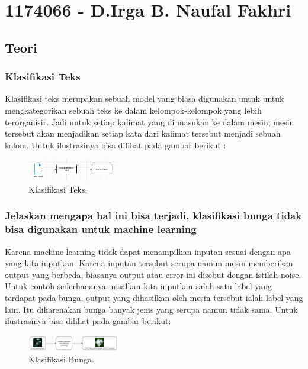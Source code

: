 \section{1174066 - D.Irga B. Naufal Fakhri}
\subsection{Teori}
\subsubsection{Klasifikasi Teks}
\hfill\break
Klasifikasi teks merupakan sebuah model yang biasa digunakan untuk untuk mengkategorikan sebuah teks ke dalam kelompok-kelompok yang lebih terorganisir. Jadi untuk setiap kalimat yang di masukan ke dalam mesin, mesin tersebut akan menjadikan setiap kata dari kalimat tersebut menjadi sebuah kolom. Untuk ilustrasinya bisa dilihat pada gambar berikut : 

\begin{figure}[H]
\centering
\includegraphics[width=4cm]{figures/1174066/4/1.jpg}
\caption{Klasifikasi Teks.}
\end{figure}

\subsubsection{Jelaskan mengapa hal ini bisa terjadi, klasifikasi bunga tidak bisa digunakan untuk machine learning}
\hfill\break
Karena machine learning tidak dapat menampilkan inputan sesuai dengan apa yang kita inputkan. Karena inputan tersebut serupa namun mesin memberikan output yang berbeda, biasanya output atau error ini disebut dengan istilah noise. Untuk contoh sederhananya misalkan kita inputkan salah satu label yang terdapat pada bunga, output yang dihasilkan oleh mesin tersebut ialah label yang lain. Itu dikarenakan bunga banyak jenis yang serupa namun tidak sama. Untuk ilustrasinya bisa dilihat pada gambar berikut: 

\begin{figure}[H]
\centering
\includegraphics[width=4cm]{figures/1174066/4/2.jpg}
\caption{Klasifikasi Bunga.}
\end{figure}

